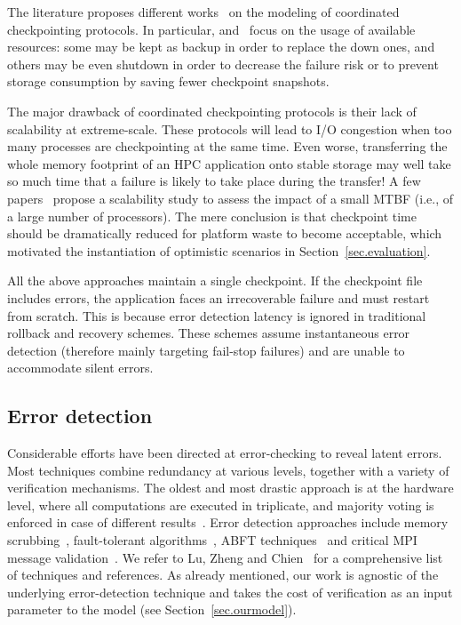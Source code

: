 \documentclass[10pt,table]{article}
\begin{document}
The literature proposes different
works~\cite{Plank01processorallocation,SunICPP10,Wang_DSN05,4367962,5289177}
on the modeling of coordinated checkpointing
protocols. In particular,  \cite{SunICPP10} and~\cite{Plank01processorallocation}
focus on the usage of available resources: some may be kept as backup
in order to replace the down ones, and others may be even shutdown in
order to decrease the failure risk or to prevent storage consumption
by saving fewer checkpoint snapshots.

The major drawback of coordinated checkpointing protocols is their
lack of scalability at extreme-scale.  These protocols will lead to
I/O congestion when too many processes are checkpointing at the same
time. Even worse, transferring the whole memory footprint of an HPC
application onto stable storage may well take so much time that a
failure is likely to take place during the transfer!  A few
papers~\cite{5289177,j116} propose a scalability study to assess the
impact of a small MTBF (i.e., of a large number of
processors). The mere conclusion is that checkpoint time should be
dramatically reduced for platform waste to become
acceptable, which motivated the instantiation of optimistic scenarios in
Section~\ref{sec.evaluation}.

All the above approaches maintain a single checkpoint. If the checkpoint file includes errors, the application 
faces an irrecoverable failure and must restart from scratch. This is because error 
detection latency is ignored in traditional rollback and recovery schemes. These schemes
assume instantaneous error detection (therefore mainly targeting fail-stop failures)
and are unable to accommodate silent errors.

\subsection{Error detection}

Considerable efforts have been directed at error-checking to reveal latent errors.
Most techniques combine redundancy at various levels, together with a variety
of verification mechanisms. The oldest and most drastic approach is at the hardware level,
where all computations are executed in triplicate, and majority voting is enforced in case
of different results~\cite{Lyons1962}. Error detection approaches include 
memory scrubbing~\cite{Hwang2012}, fault-tolerant 
algorithms~\cite{Bronevetsky2008,Heroux2011,Shantharam2011}, ABFT 
techniques~\cite{Kuang1984,Bosilca2009} and critical MPI message validation~\cite{Fiala2012}.
We refer to Lu, Zheng and Chien~\cite{LuZhengChien2013} for a comprehensive list
of techniques and references. As already mentioned, our work is agnostic of the underlying
error-detection technique and takes the cost of verification as an input parameter to the model
(see Section~\ref{sec.ourmodel}).
\end{document}
